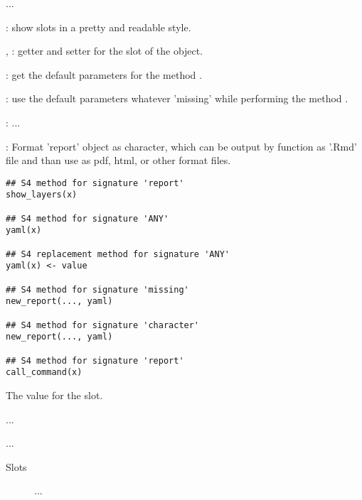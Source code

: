\documentclass[letterpaper]{book}
\begin{document}
\begin{Description}\relax
...

: show  slots in a pretty
and readable style.

, : getter and setter
for the  slot of the object.

: get the default parameters for the method .

: use the default parameters whatever 'missing'
while performing the method .

: ...

: Format 'report' object as character, which can be output
by  function as '.Rmd' file and than use  as
pdf, html, or other format files.
\end{Description}
%
\begin{Usage}
\begin{verbatim}
## S4 method for signature 'report'
show_layers(x)

## S4 method for signature 'ANY'
yaml(x)

## S4 replacement method for signature 'ANY'
yaml(x) <- value

## S4 method for signature 'missing'
new_report(..., yaml)

## S4 method for signature 'character'
new_report(..., yaml)

## S4 method for signature 'report'
call_command(x)
\end{verbatim}
\end{Usage}
%
\begin{Arguments}
\begin{ldescription}
\item[\code{value}] The value for the slot.

\item[\code{...}] ...

\item[\code{yaml}] ...
\end{ldescription}
\end{Arguments}
%
\begin{Section}{Slots}

\begin{description}

\item[] ...

\end{description}
\end{Section}
\end{document}
